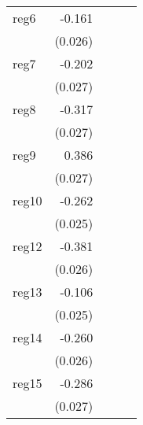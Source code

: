 {\begin{longtable}{l*{4}{D{.}{.}{-1}}}
\addlinespace
reg6        &      -0.161\sym{***}&                     &                     &                     \\
            &     (0.026)         &                     &                     &                     \\
\addlinespace
reg7        &      -0.202\sym{***}&                     &                     &                     \\
            &     (0.027)         &                     &                     &                     \\
\addlinespace
reg8        &      -0.317\sym{***}&                     &                     &                     \\
            &     (0.027)         &                     &                     &                     \\
\addlinespace
reg9        &       0.386\sym{***}&                     &                     &                     \\
            &     (0.027)         &                     &                     &                     \\
\addlinespace
reg10       &      -0.262\sym{***}&                     &                     &                     \\
            &     (0.025)         &                     &                     &                     \\
\addlinespace
reg12       &      -0.381\sym{***}&                     &                     &                     \\
            &     (0.026)         &                     &                     &                     \\
\addlinespace
reg13       &      -0.106\sym{***}&                     &                     &                     \\
            &     (0.025)         &                     &                     &                     \\
\addlinespace
reg14       &      -0.260\sym{***}&                     &                     &                     \\
            &     (0.026)         &                     &                     &                     \\
\addlinespace
reg15       &      -0.286\sym{***}&                     &                     &                     \\
            &     (0.027)         &                     &                     &                     \\

\end{longtable}}
